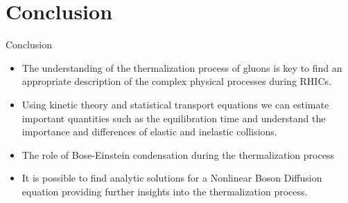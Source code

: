 \section{Conclusion}

\begin{frame}{Conclusion}
	\begin{itemize}
		\item The understanding of the thermalization process of gluons is key to find an appropriate description of the complex physical processes during RHICs.
		\item Using \alert{kinetic theory} and \alert{statistical transport equations} we can estimate important quantities such as the \alert{equilibration time} and understand the importance and differences of \alert{elastic and inelastic collisions}.
		\item The role of \alert{Bose-Einstein condensation} during the thermalization process 
		\item It is possible to find \alert{analytic solutions for a Nonlinear Boson Diffusion equation} providing further insights into the thermalization process.

	\end{itemize}
\end{frame}